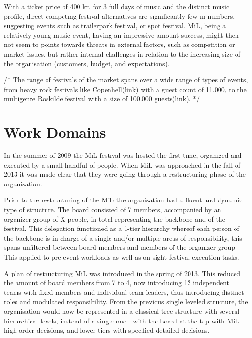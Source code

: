 \bigskip

With a ticket price of 400 kr. for 3 full days of music and the distinct music profile, direct competing festival alternatives are significantly few in numbers, suggesting events such as trailerpark festival, or spot festival. MiL, being a relatively young music event, having an impressive amount success, might then not seem to points towards threats in external factors, such as competition or market issues, but rather internal challenges in relation to the increasing size of the organisation (customers, budget, and expectations). 

\bigskip

/*
The range of festivals of the market spans over a wide range of types of events, from heavy rock festivals like Copenhell(link) with a guest count of 11.000, to the multigenre Roskilde festival with a size of 100.000 guests(link). 
*/


\section{Work Domains}

In the summer of 2009 the MiL festival was hosted the first time, organized and executed by a small handful of people. When MiL was approached in the fall of 2013 it was made clear that they were going through a restructuring phase of the organisation.

\smallskip

Prior to the restructuring of the MiL the organisation had a fluent and dynamic type of structure. The board consisted of 7 members, accompanied by an organizer-group of X people, in total representing the backbone and of the festival. This delegation functioned as a 1-tier hierarchy whereof each person of the backbone is in charge of a single and/or multiple areas of responsibility, this spans unfiltered between board members and members of the organizer-group. This applied to pre-event workloads as well as on-sight festival execution tasks.

\smallskip

A plan of restructuring MiL was introduced in the spring of 2013. This reduced the amount of board members from 7 to 4, now introducing 12 independent teams with fixed members and individual team leaders, thus introducing distinct roles and modulated responsibility. From the previous single leveled structure, the organisation would now be represented in a classical tree-structure with several hierarchical levels, instead of a single one - with the board at the top with MiL high order decisions, and lower tiers with specified detailed decisions.

